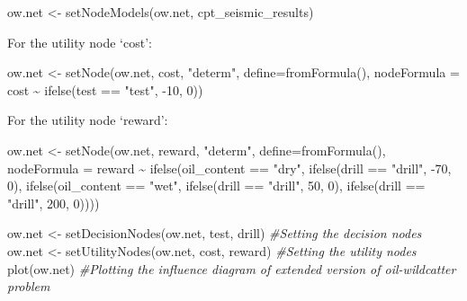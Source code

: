 \documentclass[
]{article}
\newenvironment{Shaded}{\begin{snugshade}}{\end{snugshade}}
\newcommand{\AttributeTok}[1]{\textcolor[rgb]{0.77,0.63,0.00}{#1}}
\newcommand{\CommentTok}[1]{\textcolor[rgb]{0.56,0.35,0.01}{\textit{#1}}}
\newcommand{\DecValTok}[1]{\textcolor[rgb]{0.00,0.00,0.81}{#1}}
\newcommand{\FunctionTok}[1]{\textcolor[rgb]{0.00,0.00,0.00}{#1}}
\newcommand{\NormalTok}[1]{#1}
\newcommand{\OtherTok}[1]{\textcolor[rgb]{0.56,0.35,0.01}{#1}}
\newcommand{\SpecialCharTok}[1]{\textcolor[rgb]{0.00,0.00,0.00}{#1}}
\newcommand{\StringTok}[1]{\textcolor[rgb]{0.31,0.60,0.02}{#1}}
\begin{document}
\begin{Shaded}
\begin{Highlighting}[]
\NormalTok{ow.net }\OtherTok{\textless{}{-}} \FunctionTok{setNodeModels}\NormalTok{(ow.net, cpt\_seismic\_results)}
\end{Highlighting}
\end{Shaded}

For the utility node `cost':

\begin{Shaded}
\begin{Highlighting}[]
\NormalTok{ow.net }\OtherTok{\textless{}{-}} \FunctionTok{setNode}\NormalTok{(ow.net, cost, }\StringTok{"determ"}\NormalTok{, }\AttributeTok{define=}\FunctionTok{fromFormula}\NormalTok{(),}
                  \AttributeTok{nodeFormula =}\NormalTok{ cost }\SpecialCharTok{\textasciitilde{}} \FunctionTok{ifelse}\NormalTok{(test }\SpecialCharTok{==} \StringTok{"test"}\NormalTok{, }\SpecialCharTok{{-}}\DecValTok{10}\NormalTok{, }\DecValTok{0}\NormalTok{))}
\end{Highlighting}
\end{Shaded}

For the utility node `reward':

\begin{Shaded}
\begin{Highlighting}[]
\NormalTok{ow.net }\OtherTok{\textless{}{-}} \FunctionTok{setNode}\NormalTok{(ow.net, reward, }\StringTok{"determ"}\NormalTok{, }\AttributeTok{define=}\FunctionTok{fromFormula}\NormalTok{(),}
                  \AttributeTok{nodeFormula =}\NormalTok{ reward }\SpecialCharTok{\textasciitilde{}} \FunctionTok{ifelse}\NormalTok{(oil\_content }\SpecialCharTok{==} \StringTok{"dry"}\NormalTok{,}
                                                      \FunctionTok{ifelse}\NormalTok{(drill }\SpecialCharTok{==} \StringTok{"drill"}\NormalTok{, }\SpecialCharTok{{-}}\DecValTok{70}\NormalTok{, }\DecValTok{0}\NormalTok{),}
                                                      \FunctionTok{ifelse}\NormalTok{(oil\_content }\SpecialCharTok{==} \StringTok{"wet"}\NormalTok{,}
                                                             \FunctionTok{ifelse}\NormalTok{(drill }\SpecialCharTok{==} \StringTok{"drill"}\NormalTok{, }\DecValTok{50}\NormalTok{, }\DecValTok{0}\NormalTok{),}
                                                             \FunctionTok{ifelse}\NormalTok{(drill }\SpecialCharTok{==} \StringTok{"drill"}\NormalTok{, }\DecValTok{200}\NormalTok{, }\DecValTok{0}\NormalTok{))))}

\NormalTok{ow.net }\OtherTok{\textless{}{-}} \FunctionTok{setDecisionNodes}\NormalTok{(ow.net, test, drill) }\CommentTok{\#Setting the decision nodes}
\NormalTok{ow.net }\OtherTok{\textless{}{-}} \FunctionTok{setUtilityNodes}\NormalTok{(ow.net, cost, reward) }\CommentTok{\#Setting the utility nodes}
\FunctionTok{plot}\NormalTok{(ow.net) }\CommentTok{\#Plotting the influence diagram of extended version of oil{-}wildcatter problem}
\end{Highlighting}
\end{Shaded}
\end{document}
